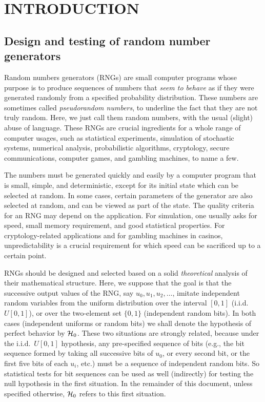 \chapter {INTRODUCTION}

\section {Design and testing of random number generators}

Random numbers generators (RNGs) are small computer programs whose
purpose is to produce sequences of numbers that
{\em seem to behave\/} as if they were generated randomly from 
a specified probability distribution.
These numbers are sometimes called {\em pseudorandom numbers}, 
to underline the fact that they are not truly random.
Here, we just call them random numbers, with the usual (slight) 
abuse of language.
These RNGs are crucial ingredients
for a whole range of computer usages, such as statistical experiments,
simulation of stochastic systems, numerical analysis, 
probabilistic algorithms, cryptology, secure communications,
computer games, and gambling machines, to name a few.

The numbers must be generated quickly and easily by a
computer program that is small, simple, and deterministic,
except for its initial state which can be selected at random.
In some cases, certain parameters of the generator are also selected
at random, and can be viewed as part of the state.
The quality criteria for an RNG may depend on the application.
For simulation, one usually asks for speed, small memory requirement,
and good statistical properties.
For cryptology-related applications and for gambling machines in casinos,
unpredictability is a crucial requirement for which speed can be
sacrificed up to a certain point.

RNGs should be designed and selected based on a
solid {\em theoretical\/} analysis of their mathematical structure.
Here, we suppose that the goal is that the successive output 
values of the RNG, say $u_0, u_1, u_2, \dots$, 
imitate independent random variables from the uniform
distribution over the interval $[0,1]$ (i.i.d.\ $U[0,1]$),
or over the two-element set $\{0,1\}$ (independent random bits).
In both cases (independent uniforms or random bits) we shall denote the
hypothesis of perfect behavior by $\mathcal{H}_0$.
These two situations are strongly related, because under the i.i.d.\
$U[0,1]$ hypothesis, any pre-specified sequence of bits (e.g.,
the bit sequence formed by taking all successive bits of $u_0$, 
or every second bit, or the first five bits of each $u_i$, etc.)
must be a sequence of independent random bits.
So statistical tests for bit sequences can be used as well 
(indirectly) for testing the null hypothesis in the first situation.
In the remainder of this document, unless specified otherwise,
$\mathcal{H}_0$ refers to this first situation.

